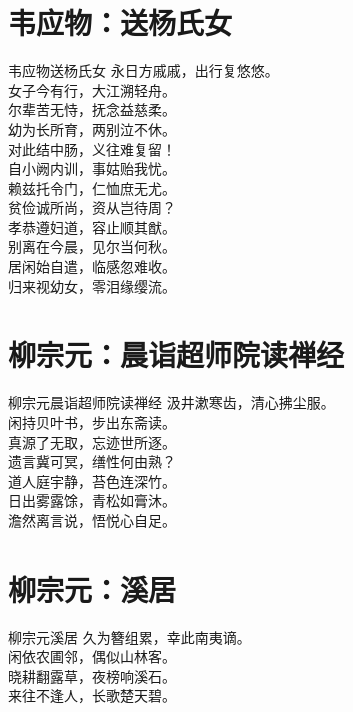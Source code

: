 \documentclass[12pt,oneside,a5paper]{book}
\begin{document}
\chapter{韦应物：送杨氏女}
\begin{poemzh}{韦应物}{送杨氏女}
永日方戚戚，出行复悠悠。\\
女子今有行，大江溯轻舟。\\
尔辈苦无恃，抚念益慈柔。\\
幼为长所育，两别泣不休。\\
对此结中肠，义往难复留！\\
自小阙内训，事姑贻我忧。\\
赖兹托令门，仁恤庶无尤。\\
贫俭诚所尚，资从岂待周？\\
孝恭遵妇道，容止顺其猷。\\
别离在今晨，见尔当何秋。\\
居闲始自遣，临感忽难收。\\
归来视幼女，零泪缘缨流。\\ 
\end{poemzh}

\chapter{柳宗元：晨诣超师院读禅经}
\begin{poemzh}{柳宗元}{晨诣超师院读禅经}
汲井漱寒齿，清心拂尘服。\\
闲持贝叶书，步出东斋读。\\
真源了无取，忘迹世所逐。\\
遗言冀可冥，缮性何由熟？\\
道人庭宇静，苔色连深竹。\\
日出雾露馀，青松如膏沐。\\
澹然离言说，悟悦心自足。\\ 
\end{poemzh}

\chapter{柳宗元：溪居}
\begin{poemzh}{柳宗元}{溪居}
久为簪组累，幸此南夷谪。\\
闲依农圃邻，偶似山林客。\\
晓耕翻露草，夜榜响溪石。\\
来往不逢人，长歌楚天碧。\\ 
\end{poemzh}
\end{document}

